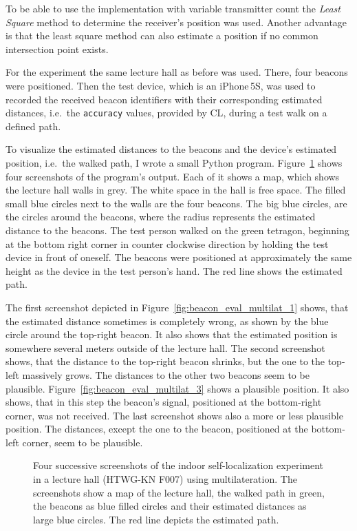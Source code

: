 To be able to use the implementation with variable transmitter count the \emph{Least Square} method to determine the receiver's position was used. Another advantage is that the least square method can also estimate a position if no common intersection point exists.

For the experiment the same lecture hall as before was used. There, four beacons were positioned. Then the test device, which is an iPhone\,5S, was used to recorded the received beacon identifiers with their corresponding estimated distances, i.e.\ the \texttt{accuracy} values, provided by \acs{CL}, during a test walk on a defined path.

To visualize the estimated distances to the beacons and the device's estimated position, i.e.\ the walked path, I wrote a small Python program. Figure~\ref{fig:beacon_eval_multilat} shows four screenshots of the program's output. Each of it shows a map, which shows the lecture hall walls in grey. The white space in the hall is free space. The filled small blue circles next to the walls are the four beacons. The big blue circles, are the circles around the beacons, where the radius represents the estimated distance to the beacons. The test person walked on the green tetragon, beginning at the bottom right corner in counter clockwise direction by holding the test device in front of oneself. The beacons were positioned at approximately the same height as the device in the test person's hand. The red line shows the estimated path.

The first screenshot depicted in Figure~\ref{fig:beacon_eval_multilat_1} shows, that the estimated distance sometimes is completely wrong, as shown by the blue circle around the top-right beacon. It also shows that the estimated position is somewhere several meters outside of the lecture hall. The second screenshot shows, that the distance to the top-right beacon shrinks, but the one to the top-left massively grows. The distances to the other two beacons seem to be plausible. Figure~\ref{fig:beacon_eval_multilat_3} shows a plausible position. It also shows, that in this step the beacon's signal, positioned at the bottom-right corner, was not received. The last screenshot shows also a more or less plausible position. The distances, except the one to the beacon, positioned at the bottom-left corner, seem to be plausible.

\begin{figure}
  
  \caption{Four successive screenshots of the indoor self-localization experiment in a lecture hall (HTWG-KN F007) using multilateration. The screenshots show a map of the lecture hall, the walked path in green, the beacons as blue filled circles and their estimated distances as large blue circles. The red line depicts the estimated path.}
  \label{fig:beacon_eval_multilat}
\end{figure}

